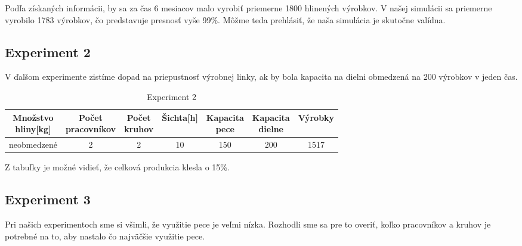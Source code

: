 \documentclass[11pt,a4paper]{article}
\begin{document}
Podľa získaných informácii, by sa za čas 6 mesiacov malo vyrobiť priemerne 1800 hlinených výrobkov. V našej simulácii sa priemerne vyrobilo 1783 výrobkov, čo predstavuje presnosť vyše 99\%. Môžme teda prehlásiť, že naša simulácia je skutočne valídna.

\subsection{Experiment 2}
V ďalšom experimente zistíme dopad na priepustnosť výrobnej linky, ak by bola kapacita na dielni obmedzená na 200 výrobkov v jeden čas.
\begin{table}[ht]
	\centering
	\begin{tabular}{|c|c|c|c|c|c|c|}
		\hline
		\makecell{Množstvo \\ hliny[kg]} & \makecell{Počet \\ pracovníkov} & \makecell{Počet \\ kruhov} & Šichta[h] & \makecell{Kapacita \\ pece} & \makecell{Kapacita \\ dielne} & Výrobky \\ \hline
		neobmedzené & 2 & 2 & 10 & 150 & 200 & 1517 \\ \hline
	\end{tabular}

	\caption{Experiment 2}
	\label{table:experiment2}
\end{table}

Z tabuľky je možné vidieť, že celková produkcia klesla o 15\%.
\subsection{Experiment 3}
Pri našich experimentoch sme si všimli, že využitie pece je veľmi nízka. Rozhodli sme sa pre to overiť, koľko pracovníkov a kruhov je potrebné na to, aby nastalo čo najväčšie využitie pece.
\end{document}
